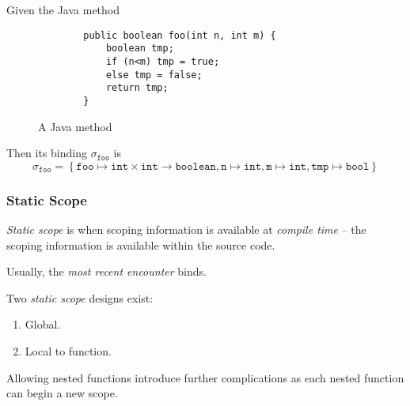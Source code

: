 \begin{example}
    Given the Java method
    \begin{figure}[H]
        \centering
        \begin{verbatim}
        public boolean foo(int n, int m) {
            boolean tmp;
            if (n<m) tmp = true;
            else tmp = false;
            return tmp;
        }
        \end{verbatim}
        \caption{A Java method}
        \label{prog:example-java-binding}
    \end{figure}
    
    Then its binding $\sigma_{\texttt{foo}}$ is
    \begin{equation}
        \sigma_{\texttt{foo}} = \left\lbrace
            \texttt{foo} \mapsto \texttt{int} \times \texttt{int} \to \texttt{boolean},
            \texttt{n} \mapsto \texttt{int},
            \texttt{m} \mapsto \texttt{int},
            \texttt{tmp} \mapsto \texttt{bool}
        \right\rbrace
    \end{equation}
\end{example}

\subsubsection{Static Scope}

\begin{definition}
    \textit{Static scope} is when scoping information is available at \textit{compile time} -- the scoping information is available within the source code.
    
    Usually, the \textit{most recent encounter} binds.
\end{definition}

\begin{definition}
    Two \textit{static scope} designs exist:
    \begin{enumerate}
        \item Global.
        \item Local to function.
    \end{enumerate}
    
    Allowing nested functions introduce further complications as each nested function can begin a new scope.
\end{definition}

